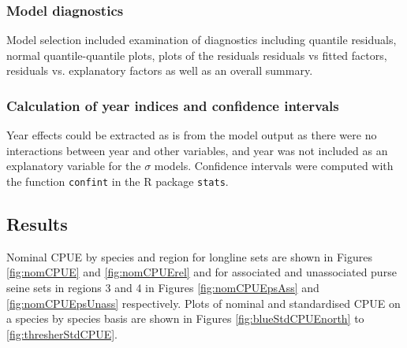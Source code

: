 \subsubsection{Model diagnostics}                                                                                      
Model selection included examination of diagnostics including quantile residuals, normal quantile-quantile plots, plots of the  residuals residuals vs fitted factors, residuals  vs. explanatory factors as well as an overall summary.


\subsubsection{Calculation of year indices and confidence intervals}
Year effects could be extracted as is from the model output as there were no interactions between year and other variables, and year was not included as an explanatory variable for the $\sigma$ models. Confidence intervals were computed with the function \texttt{confint} in the R package \texttt{stats}.

\clearpage
\subsection{Results}

Nominal CPUE by species and region for longline sets are shown in Figures \ref{fig:nomCPUE} and \ref{fig:nomCPUErel} and for associated and unassociated purse seine sets in regions 3 and 4 in Figures \ref{fig:nomCPUEpsAss} and \ref{fig:nomCPUEpsUnass} respectively. Plots of nominal and standardised CPUE on a species by species basis are shown in Figures \ref{fig:blueStdCPUEnorth} to \ref{fig:thresherStdCPUE}.
 
